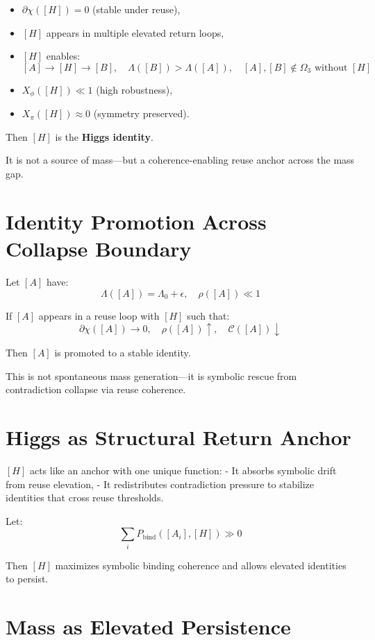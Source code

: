 \begin{itemize}
  \item $\partial\chi([H]) = 0$ (stable under reuse),
  \item $[H]$ appears in multiple elevated return loops,
  \item $[H]$ enables:
    \[
    [A] \to [H] \to [B],\quad \Lambda([B]) > \Lambda([A]),\quad [A], [B] \not\in \Omega_3 \text{ without } [H]
    \]
  \item $X_\phi([H]) \ll 1$ (high robustness),
  \item $X_\pi([H]) \approx 0$ (symmetry preserved).
\end{itemize}

Then $[H]$ is the \textbf{Higgs identity}.

It is not a source of mass—but a coherence-enabling reuse anchor across the mass gap.

\section{Identity Promotion Across Collapse Boundary} \label{sec:promotion}

Let $[A]$ have:
\[
\Lambda([A]) = \Lambda_0 + \epsilon,\quad \rho([A]) \ll 1
\]

If $[A]$ appears in a reuse loop with $[H]$ such that:
\[
\partial\chi([A]) \to 0,\quad \rho([A]) \uparrow,\quad \mathcal{C}([A]) \downarrow
\]

Then $[A]$ is promoted to a stable identity.

This is not spontaneous mass generation—it is symbolic rescue from contradiction collapse via reuse coherence.

\section{Higgs as Structural Return Anchor} \label{sec:higgs-anchor}

$[H]$ acts like an anchor with one unique function:
- It absorbs symbolic drift from reuse elevation,
- It redistributes contradiction pressure to stabilize identities that cross reuse thresholds.

Let:
\[
\sum_{i} P_{\text{bind}}([A_i], [H]) \gg 0
\]

Then $[H]$ maximizes symbolic binding coherence and allows elevated identities to persist.

\section{Mass as Elevated Persistence} \label{sec:higgs-mass}

